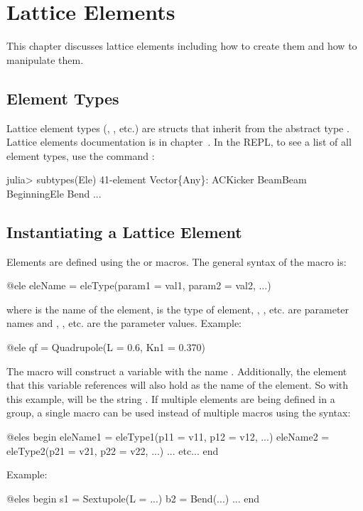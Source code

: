 \chapter{Lattice Elements}
\label{c:ele}

This chapter discusses lattice elements including how to create them and how to manipulate them.

\section{Element Types}
\label{s:ele.types}

Lattice element types (, , etc.) are structs that inherit from the abstract 
type . Lattice elements documentation is in chapter~. 
In the REPL, to see a list of all element types, use the command :
\begin{example}
  julia> subtypes(Ele)
  41-element Vector\{Any\}:
   ACKicker
   BeamBeam
   BeginningEle
   Bend
   ...
\end{example}

\section{Instantiating a Lattice Element}
\label{s:ele.def}

Elements are defined using the  or  macros. 
The general syntax of the  macro is:
\begin{example}
  @ele eleName = eleType(param1 = val1, param2 = val2, ...)
\end{example}
where  is the name of the element,  is the type of element, 
, ,
etc. are parameter names and , , etc. are the parameter values.
Example:
\begin{example}
  @ele qf = Quadrupole(L = 0.6, Kn1 = 0.370)
\end{example}
The  macro will construct a \julia variable with the name . 
Additionally, the element
that this variable references will also hold  as the name of the element. So with this
example,  will be the string . If multiple elements are being defined in a 
group, a single
 macro can be used instead of multiple  macros using the syntax:
\begin{example}
  @eles begin
    eleName1 = eleType1(p11 = v11, p12 = v12, ...)
    eleName2 = eleType2(p21 = v21, p22 = v22, ...)
    ... etc...
  end
\end{example}
Example:
\begin{example}
  @eles begin
    s1 = Sextupole(L = ...)
    b2 = Bend(...)
    ...
  end
\end{example}

